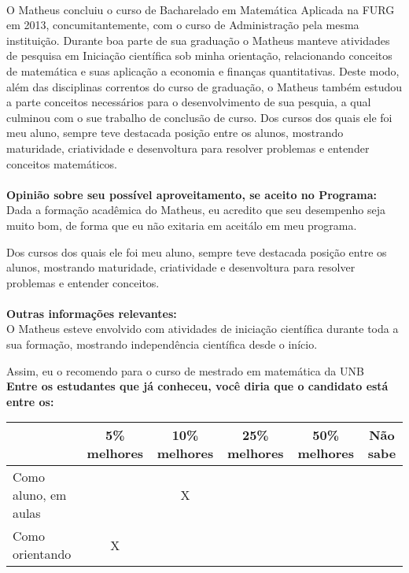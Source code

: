\documentclass[11pt]{article}
\begin{document}
\\O Matheus concluiu o curso de Bacharelado em Matemática Aplicada na FURG em 2013, concumitantemente, com o curso de Administração pela mesma instituição. Durante boa parte de sua graduação o Matheus manteve atividades de pesquisa em Iniciação científica sob minha orientação, relacionando conceitos de matemática e suas aplicação a economia e finanças quantitativas. Deste modo, além das disciplinas correntos do curso de graduação, o Matheus também estudou a parte conceitos necessários para o desenvolvimento de sua pesquia, a qual culminou com o sue trabalho de conclusão de curso. Dos cursos dos quais ele foi meu aluno, sempre teve destacada posição entre os alunos, mostrando maturidade, criatividade e desenvoltura para resolver problemas e entender conceitos matemáticos.
\\
\\
\textbf{Opinião sobre seu possível aproveitamento, se aceito no Programa:}
\\Dada a formação acadêmica do Matheus, eu acredito que seu desempenho seja muito bom, de forma que eu não exitaria em aceitálo em meu programa. 

Dos cursos dos quais ele foi meu aluno, sempre teve destacada posição entre os alunos, mostrando maturidade, criatividade e desenvoltura para resolver problemas e entender conceitos.\\ 
\\
\textbf{Outras informações relevantes:} \\O Matheus esteve envolvido com atividades de iniciação científica durante toda a sua formação, mostrando independência científica desde o início. 

Assim, eu o recomendo para o curso de mestrado em matemática da UNB
\\[0.3cm]
\textbf{Entre os estudantes que já conheceu, você diria que o candidato está entre os:}
\\
\begin{tabular}{|l|c|c|c|c|c|}
\hline
 & 5\% melhores & 10\% melhores & 25\% melhores & 50\% melhores & Não sabe \\
\hline
Como aluno, em aulas &  & X &  &  & \\
\hline
Como orientando & X &  &  &  & \\
\hline
\end{tabular}
\end{document}
